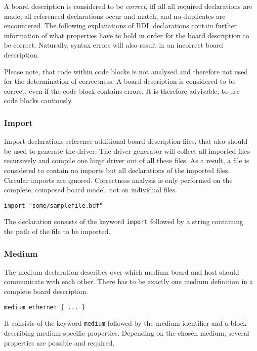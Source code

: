 \documentclass{report}
\begin{document}
A board description is considered to be \textit{correct}, iff all all required declarations are made, all referenced declarations occur and match, and no duplicates are encountered. The following explanations of BDL declarations contain further information of what properties have to hold in order for the board description to be correct. Naturally, syntax errors will also result in an incorrect board description.

Please note, that code within code blocks is not analysed and therefore not used for the determination of correctness. A board description is considered to be correct, even if the code block contains errors. It is therefore advisable, to use code blocks cautiously.

\subsubsection{Import}
Import declarations reference additional board description files, that also should be used to generate the driver. The driver generator will collect all imported files recursively and compile one large driver out of all these files. As a result, a file is considered to contain no imports but all declarations of the imported files. Circular imports are ignored. Correctness analysis is only performed on the complete, composed board model, not on individual files. 

\begin{lstlisting}[language=bdl]
import "some/samplefile.bdf"
\end{lstlisting}

The declaration consists of the keyword \texttt{import} followed by a string containing the path of the file to be imported.

\subsubsection{Medium}
The medium declaration describes over which medium board and host should communicate with each other. There has to be exactly one medium definition in a complete board description.

\begin{lstlisting}[language=bdl]
medium ethernet { ... }
\end{lstlisting}

It consists of the keyword \texttt{medium} followed by the medium identifier and a block describing medium-specific properties. Depending on the chosen medium, several properties are possible and required.
\end{document}
